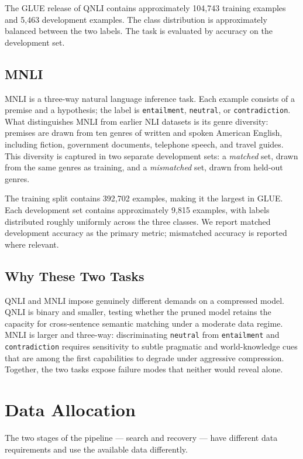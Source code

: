 The GLUE release of QNLI contains approximately 104{,}743 training examples and
5{,}463 development examples. The class distribution is approximately balanced
between the two labels. The task is evaluated by accuracy on the development
set.

\subsection{MNLI}

MNLI \citep{williams2018mnli} is a three-way natural language inference task.
Each example consists of a premise and a hypothesis; the label is
\texttt{entailment}, \texttt{neutral}, or \texttt{contradiction}. What
distinguishes MNLI from earlier NLI datasets is its genre diversity: premises
are drawn from ten genres of written and spoken American English, including
fiction, government documents, telephone speech, and travel guides. This
diversity is captured in two separate development sets: a \emph{matched} set,
drawn from the same genres as training, and a \emph{mismatched} set, drawn from
held-out genres.

The training split contains 392{,}702 examples, making it the largest in GLUE.
Each development set contains approximately 9{,}815 examples, with labels
distributed roughly uniformly across the three classes. We report matched
development accuracy as the primary metric; mismatched accuracy is reported
where relevant.

\subsection{Why These Two Tasks}

QNLI and MNLI impose genuinely different demands on a compressed model. QNLI is
binary and smaller, testing whether the pruned model retains the capacity for
cross-sentence semantic matching under a moderate data regime. MNLI is larger
and three-way: discriminating \texttt{neutral} from \texttt{entailment} and
\texttt{contradiction} requires sensitivity to subtle pragmatic and
world-knowledge cues that are among the first capabilities to degrade under
aggressive compression. Together, the two tasks expose failure modes that neither
would reveal alone.

\section{Data Allocation}
\label{sec:data}

The two stages of the pipeline --- search and recovery --- have different data
requirements and use the available data differently.

